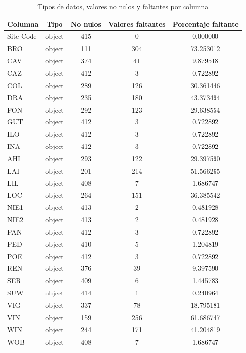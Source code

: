\documentclass[a4paper,11pt]{article}
\begin{document}

\begin{table}[ht]
    \centering
    \caption{Tipos de datos, valores no nulos y faltantes por columna}
    \label{tab:info_datos}
    \begin{tabular}{|l|c|c|c|c|}
        \hline
        Columna & Tipo & No nulos & Valores faltantes & Porcentaje faltante \\
        \hline
        Site Code & object & 415 & 0 & 0.000000 \\
        BRO & object & 111 & 304 & 73.253012 \\
        CAV  & object & 374 & 41 & 9.879518 \\
        CAZ  & object & 412 & 3 & 0.722892 \\
        COL    & object & 289 & 126 & 30.361446 \\
        DRA  & object & 235 & 180 & 43.373494 \\
        FON  & object & 292 & 123 & 29.638554 \\
        GUT  & object & 412 & 3 & 0.722892 \\
        ILO & object & 412 & 3 & 0.722892 \\
        INA  & object & 412 & 3 & 0.722892 \\
        AHI & object & 293 & 122 & 29.397590 \\
        LAI  & object & 201 & 214 & 51.566265 \\
        LIL & object & 408 & 7 & 1.686747 \\
        LOC  & object & 264 & 151 & 36.385542 \\
        NIE1 & object & 413 & 2 & 0.481928 \\
        NIE2 & object & 413 & 2 & 0.481928 \\
        PAN  & object & 412 & 3 & 0.722892 \\
        PED  & object & 410 & 5 & 1.204819 \\
        POE  & object & 412 & 3 & 0.722892 \\
        REN  & object & 376 & 39 & 9.397590 \\
        SER & object & 409 & 6 & 1.445783 \\
        SUW  & object & 414 & 1 & 0.240964 \\
        VIG  & object & 337 & 78 & 18.795181 \\
        VIN  & object & 159 & 256 & 61.686747 \\
        WIN & object & 244 & 171 & 41.204819 \\
        WOB  & object & 408 & 7 & 1.686747 \\
        \hline
    \end{tabular}
\end{table}
\end{document}
